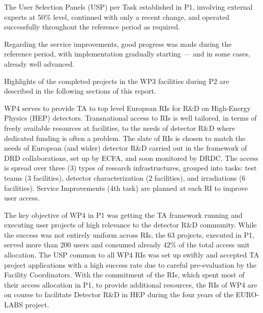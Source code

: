 The User Selection Panels (USP) per Task established in P1, involving external experts at 50\% level,  continued with only a recent change, and operated successfully throughout the reference period as required. 

Regarding the service improvements, good progress was made during the reference period, with implementation gradually starting — and in some cases, already well advanced.

Highlights of the completed projects in the WP3 facilities during P2 are described in the following sections of this report.


WP4 serves to provide TA to top level European RIs for R\&D on High-Energy Physics (HEP) detectors. Transnational access to RIs is well tailored, in terms of freely available resources at facilities, to the needs of detector R\&D where dedicated funding is often a problem. The slate of RIs is chosen to match the needs of European (and wider) detector R\&D carried out in the framework of DRD collaborations, set up by ECFA, and soon monitored by DRDC. The access is spread over three (3) types of research infrastructures, grouped into tasks: test teams (3 facilities), detector characterization (2 facilities), and irradiations (6 facilities). Service Improvements (4th task) are planned at each RI to improve user access.

The key objective of WP4 in P1 was getting the TA framework running and executing user projects of high relevance to the detector R\&D community. While the success was not entirely uniform across RIs, the 63 projects, executed in P1, served more than 200 users and consumed already 42\% of the total access unit allocation. The USP common to all WP4 RIs was set up swiftly and accepted TA project applications with a high success rate due to careful pre-evaluation by the Facility Coordinators. With the commitment of the RIs, which spent most of their access allocation in P1, to provide additional resources, the RIs of WP4 are on course to facilitate Detector R\&D in HEP during the four years of the EURO-LABS project.



